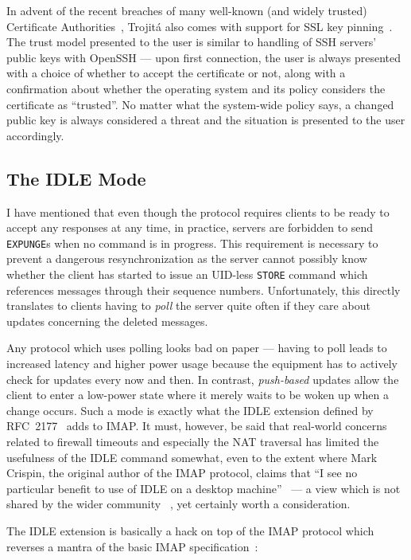 \documentclass[trojita]{subfiles}
\begin{document}
In advent of the recent breaches of many well-known (and widely trusted) Certificate Authorities~\cite{ssl-breaches},
Trojitá also comes with support for SSL key pinning~\cite{ssl-pinning}.  The trust model presented to the user is
similar to handling of SSH servers' public keys with OpenSSH --- upon first connection, the user is always presented with
a choice of whether to accept the certificate or not, along with a confirmation about whether the operating system and
its policy considers the certificate as ``trusted''.  No matter what the system-wide policy says, a changed public key
is always considered a threat and the situation is presented to the user accordingly.

\subsection{The IDLE Mode}
\label{sec:imap-idle}

I have mentioned that even though the protocol requires clients to be ready to accept any responses at any time, in
practice, servers are forbidden to send {\tt EXPUNGE}s when no command is in progress.  This requirement is necessary to
prevent a dangerous resynchronization as the server cannot possibly know whether the client has started to issue an
UID-less {\tt STORE} command which references messages through their sequence numbers.  Unfortunately, this directly
translates to clients having to {\em poll} the server quite often if they care about updates concerning the deleted
messages.

Any protocol which uses polling looks bad on paper --- having to poll leads to increased latency and higher power usage
because the equipment has to actively check for updates every now and then.  In contrast, {\em push-based} updates allow
the client to enter a low-power state where it merely waits to be woken up when a change occurs.  Such a mode is exactly
what the IDLE extension defined by RFC~2177~\cite{rfc2177} adds to IMAP.  It must, however, be said that real-world
concerns related to firewall timeouts and especially the NAT traversal has limited the usefulness of the IDLE command
somewhat, even to the extent where Mark Crispin, the original author of the IMAP protocol, claims that ``I see no
particular benefit to use of IDLE on a desktop machine''~\cite{crispin-idle-useless} --- a view which is not shared by
the wider community~\cite{tss-idle-keepalive} \cite{android-idle}, yet certainly worth a consideration.

The IDLE extension is basically a hack on top of the IMAP protocol which reverses a mantra of the basic IMAP
specification~\cite[p. 72]{rfc3501}:
\end{document}
